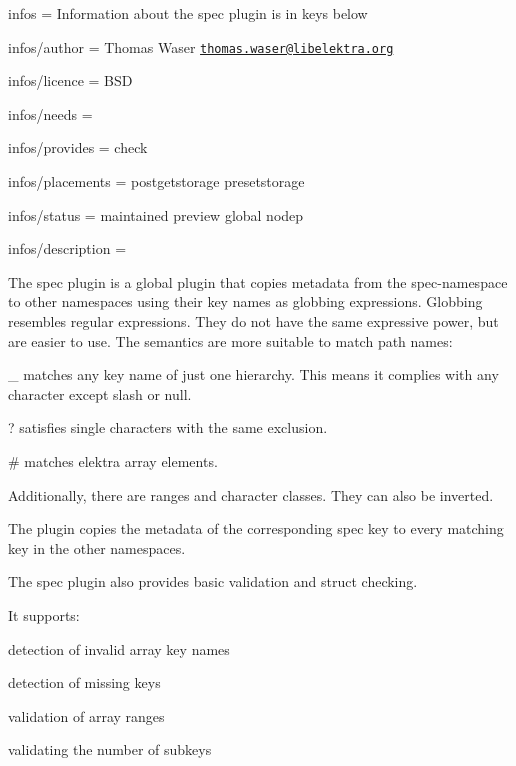 
\begin{DoxyItemize}
\item infos = Information about the spec plugin is in keys below
\item infos/author = Thomas Waser \href{mailto:thomas.waser@libelektra.org}{\tt thomas.\+waser@libelektra.\+org}
\item infos/licence = B\+S\+D
\item infos/needs =
\item infos/provides = check
\item infos/placements = postgetstorage presetstorage
\item infos/status = maintained preview global nodep
\item infos/description =
\end{DoxyItemize}

The spec plugin is a global plugin that copies metadata from the {\ttfamily spec}-\/namespace to other namespaces using their key names as globbing expressions. Globbing resembles regular expressions. They do not have the same expressive power, but are easier to use. The semantics are more suitable to match path names\+:


\begin{DoxyItemize}
\item \+\_\+ matches any key name of just one hierarchy. This means it complies with any character except slash or null.
\item ? satisfies single characters with the same exclusion.
\item \# matches elektra array elements.
\item Additionally, there are ranges and character classes. They can also be inverted.
\end{DoxyItemize}

The plugin copies the metadata of the corresponding {\ttfamily spec} key to every matching key in the other namespaces.

The spec plugin also provides basic validation and struct checking.

It supports\+:


\begin{DoxyItemize}
\item detection of invalid array key names
\item detection of missing keys
\item validation of array ranges
\item validating the number of subkeys
\end{DoxyItemize}

